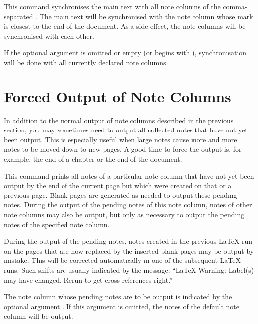 \begin{Declaration}
\end{Declaration}
This command synchronises the main text with all note columns of the
comma-separated . The main text
will be synchronised with the note column whose mark is closest to the
end of the document. As a side effect, the note columns will be synchronised
with each other.

If the optional argument is omitted or empty (or begins with ),
synchronisation will be done with all currently declared note columns.%
\EndIndexGroup


\section{Forced Output of Note Columns}

In addition to the normal output of note columns described in the previous
section, you may sometimes need to output all collected notes that have
not yet been output. This is especially useful when large notes cause more and
more notes to be moved down to new pages. A good time to force the
output is, for example, the end of a chapter or the end
of the document.

\begin{Declaration}
\end{Declaration}
This command prints all notes of a particular note
column that have not yet been output by the end of the current page but which
were created on that or a previous page. Blank pages are generated as needed
to output these pending notes. During the output of the pending notes of this
note column, notes of other note columns may also be output, but only as
necessary to output the pending notes of the specified note column.

During the output of the pending notes, notes created in the previous \LaTeX{}
run on the pages that are now replaced by the inserted blank pages may be
output by mistake. This will be corrected automatically in one of the
subsequent \LaTeX{} runs. Such shifts are usually indicated by the message:
``\LaTeX{} Warning: Label(s) may have changed. Rerun to get cross-references
right.''

The note column whose pending notes are to be output is indicated by the
optional argument . If this argument is omitted, the
notes of the default note column  will be output.

